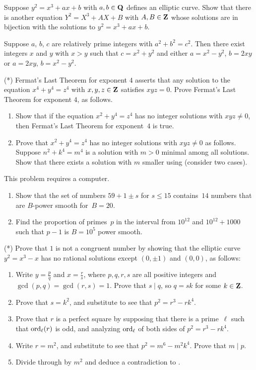 \begin{exercises}
\item \label{ex:elltrans}
 Suppose $y^2=x^3+ax+b$ with $a,b\in\mathbf{Q}$ defines an elliptic
curve.  Show that there is another equation $Y^2=X^3+AX+B$ with
$A,B\in\mathbf{Z}$ whose solutions are in bijection with the
solutions to $y^2=x^3+ax+b$.


\item\label{ex:pythag} Suppose $a$, $b$, $c$ are relatively prime
  integers with $a^2+b^2=c^2$.  Then there exist integers $x$ and $y$
  with $x>y$ such that $c=x^2+y^2$ and either $a=x^2-y^2$, $b=2xy$ or
  $a=2xy$, $b=x^2-y^2$.


\item\label{ex:flt4}(*) Fermat's Last Theorem for exponent $4$ asserts
  that any solution to the equation $x^4+y^4=z^4$ with $x,y,z\in\mathbf{Z}$
  satisfies $xyz=0$.  Prove Fermat's Last
  Theorem for exponent $4$, as follows.
\begin{enumerate}
\item Show that if the equation $x^2+y^4=z^4$ has no integer solutions
  with $xyz\neq 0$, then Fermat's Last Theorem for exponent~$4$ is
  true.
\item Prove that $x^2+y^4=z^4$ has no integer solutions with $xyz\neq
  0$ as follows.  Suppose $n^2+k^4=m^4$ is a solution with $m>0$
  minimal among all solutions.  Show that there exists a solution with
  $m$ smaller using  (consider two cases).
\end{enumerate}

\item \label{ex:bpowersmooth}
This problem requires a computer.
\begin{enumerate}
\item Show that the set of numbers $59+1\pm
s$ for $s\leq 15$ contains~$14$ numbers that are $B$-power smooth
for~$B=20$.
\item
Find the proportion of primes~$p$ in the interval
from $10^{12}$ and $10^{12}+1000$ such that $p-1$ is
$B=10^5$ power smooth.
\end{enumerate}

\item\label{ex:cong1}(*) Prove that $1$ is not a congruent number by
  showing that the elliptic curve $y^2=x^3-x$ has no rational
  solutions except $(0,\pm 1)$ and $(0,0)$, as follows:
\begin{enumerate}
\item Write $y=\frac{p}{q}$ and $x=\frac{r}{s}$, where $p,q,r,s$ are
all positive integers and $\gcd(p,q)=\gcd(r,s)=1$.  Prove that $s\mid
q$, so $q=sk$ for some $k\in\mathbf{Z}$.
\item Prove that $s=k^2$, and substitute to see that
$p^2=r^3-rk^4$.
\item Prove that $r$ is a perfect square by supposing that there is a
  prime~$\ell$ such that $\operatorname{ord}_{\ell}(r)$ is odd, and analyzing
  $\operatorname{ord}_{\ell}$ of both sides of $p^2=r^3-rk^4$.
\item Write $r=m^2$, and substitute to
see that $p^2=m^6-m^2k^4$. Prove that $m\mid p$.
\item Divide through by $m^2$ and deduce a contradiction
to .
\end{enumerate}


\end{exercises}
